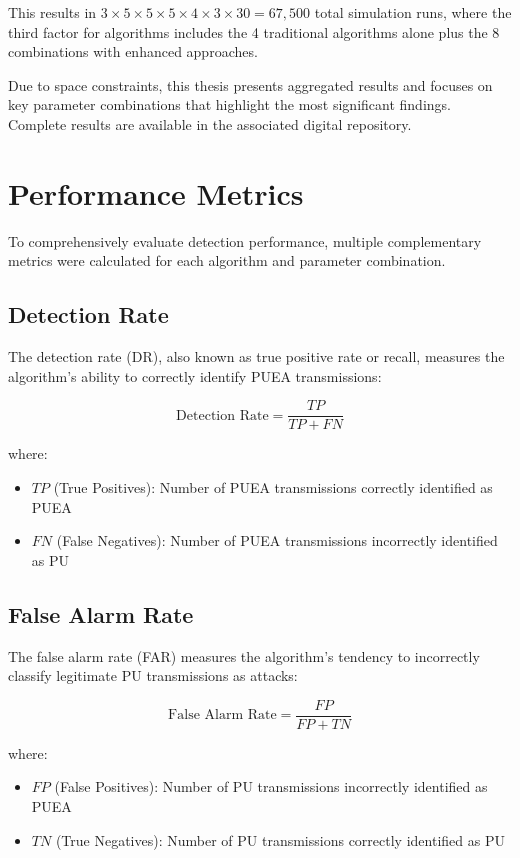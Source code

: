 This results in $3 \times 5 \times 5 \times 5 \times 4 \times 3 \times 30 = 67,500$ total simulation runs, where the third factor for algorithms includes the 4 traditional algorithms alone plus the 8 combinations with enhanced approaches.

Due to space constraints, this thesis presents aggregated results and focuses on key parameter combinations that highlight the most significant findings. Complete results are available in the associated digital repository.

\section{Performance Metrics}

To comprehensively evaluate detection performance, multiple complementary metrics were calculated for each algorithm and parameter combination.

\subsection{Detection Rate}

The detection rate (DR), also known as true positive rate or recall, measures the algorithm's ability to correctly identify PUEA transmissions:

\begin{equation}
    \text{Detection Rate} = \frac{TP}{TP + FN}
\end{equation}

where:
\begin{itemize}
    \item $TP$ (True Positives): Number of PUEA transmissions correctly identified as PUEA
    \item $FN$ (False Negatives): Number of PUEA transmissions incorrectly identified as PU
\end{itemize}

\subsection{False Alarm Rate}

The false alarm rate (FAR) measures the algorithm's tendency to incorrectly classify legitimate PU transmissions as attacks:

\begin{equation}
    \text{False Alarm Rate} = \frac{FP}{FP + TN}
\end{equation}

where:
\begin{itemize}
    \item $FP$ (False Positives): Number of PU transmissions incorrectly identified as PUEA
    \item $TN$ (True Negatives): Number of PU transmissions correctly identified as PU
\end{itemize}

